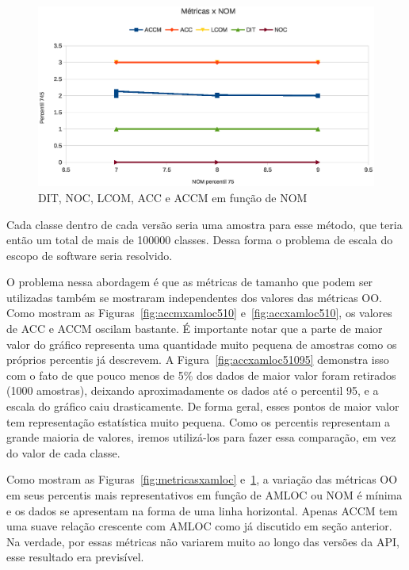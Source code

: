 \begin{figure}[!htb]
\centering
\includegraphics [keepaspectratio=true,scale=0.7]{figuras/metricasxnom.eps}
\caption{DIT, NOC, LCOM, ACC e ACCM em função de NOM}
\label{fig:metricasxnom}
\end{figure}

Cada classe dentro de cada versão seria uma amostra para esse método, que teria então um total de mais de 100000 classes. Dessa forma o problema de escala do escopo de software seria resolvido.

O problema nessa abordagem é que as métricas de tamanho que podem ser utilizadas também se mostraram independentes dos valores das métricas OO. Como mostram as Figuras~\ref{fig:accmxamloc510} e~\ref{fig:accxamloc510}, os valores de ACC e ACCM oscilam bastante. É importante notar que a parte de maior valor do gráfico representa uma quantidade muito pequena de amostras como os próprios percentis já descrevem. A Figura~\ref{fig:accxamloc51095} demonstra isso com o fato de que pouco menos de 5\% dos dados de maior valor foram retirados (1000 amostras), deixando aproximadamente os dados até o percentil 95, e a escala do gráfico caiu drasticamente. De forma geral, esses pontos de maior valor tem representação estatística muito pequena. Como os percentis representam a grande maioria de valores, iremos utilizá-los para fazer essa comparação, em vez do valor de cada classe.

Como mostram as Figuras~\ref{fig:metricasxamloc} e~\ref{fig:metricasxnom}, a variação das métricas OO em seus percentis mais representativos em função de AMLOC ou NOM é mínima e os dados se apresentam na forma de uma linha horizontal. Apenas ACCM tem uma suave relação crescente com AMLOC como já discutido em seção anterior. Na verdade, por essas métricas não variarem muito ao longo das versões da API, esse resultado era previsível.

